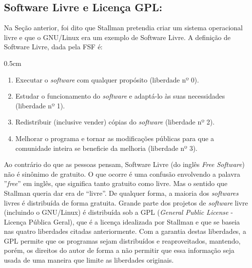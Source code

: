 \begin{refsection}
\subsection{Software Livre e Licença GPL:}\label{tut1:linux:gpl}
Na Seção anterior, foi dito que Stallman pretendia criar um sistema operacional livre e que o GNU/Linux era um exemplo de Software Livre. A definição de Software Livre, dada pela FSF é:\\
\begin {myindentpar}{0.5cm}
\begin{enumerate}[\itshape i.]
 \item{Executar o \textit{software} com qualquer propósito (liberdade nº 0).}
 \item{Estudar o funcionamento do \textit{software} e adaptá-lo às suas necessidades (liberdade nº 1).}
 \item{Redistribuir (inclusive vender) cópias do \textit{software} (liberdade nº 2).}
 \item{Melhorar o programa e tornar as modificações públicas para que a comunidade inteira se beneficie da melhoria (liberdade nº 3).}
\end{enumerate}
\end{myindentpar}

	Ao contrário do que as pessoas pensam, Software Livre (do inglês \textit{Free Software}) não é sinônimo de gratuito. O que ocorre é uma confusão envolvendo a palavra ''\textit{free}'' em inglês, que significa tanto gratuito como livre. Mas o sentido que Stallman queria dar era de ``livre''. De qualquer forma, a maioria dos \textit{softwares} livres é distribuída de forma gratuita. Grande parte dos projetos de \textit{software} livre (incluindo o GNU/Linux) é distribuída sob a GPL (\textit{General Public License} - Licença Pública Geral), que é a licença idealizada por Stallman e que se baseia nas quatro liberdades citadas anteriormente. Com a garantia destas liberdades, a GPL permite que os programas sejam distribuídos e reaproveitados, mantendo, porém, os direitos do autor de forma a não permitir que essa informação seja usada de uma maneira que limite as liberdades originais. 


\end{refsection}
